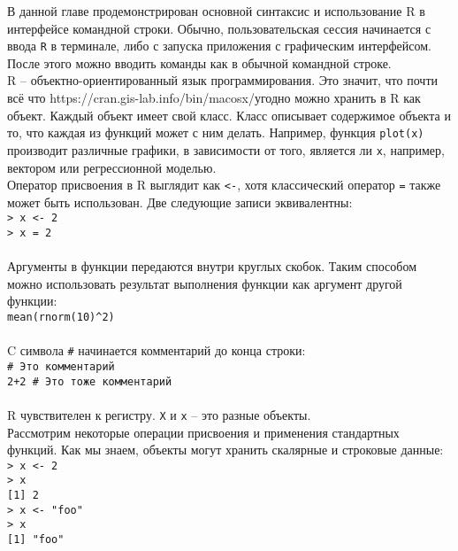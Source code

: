     В данной главе продемонстрирован основной синтаксис и использование R в интерфейсе 
    командной строки. Обычно, пользовательская сессия начинается с ввода \texttt{R} в 
    терминале, либо с запуска приложения с графическим интерфейсом. После этого можно вводить
    команды как в обычной командной строке.\\

    \indent R -- объектно-ориентированный язык программирования. Это значит, что почти всё что 
        https://cran.gis-lab.info/bin/macosx/угодно можно хранить в R как объект. Каждый объект имеет свой класс. Класс описывает
        содержимое объекта и то, что каждая из функций может с ним делать. Например, функция
        \texttt{plot(x)} производит различные графики, в зависимости от того, является ли 
        \texttt{x}, например, вектором или регрессионной моделью. \\
    
    \indent Оператор присвоения в R выглядит как \texttt{<-}, хотя классический оператор \texttt{=}
        также может быть использован. Две следующие записи эквивалентны: \\
    \indent \texttt{> x <- 2} \\
    \indent \texttt{> x = 2} \\ \\
    
    \indent Аргументы в функции передаются внутри круглых скобок. Таким способом можно использовать 
        результат выполнения функции как аргумент другой функции: \\
    \indent \texttt{mean(rnorm(10)\^{}2)} \\ \\
    
    \indent C символа \texttt{\#} начинается комментарий до конца строки: \\
    \indent \texttt{\# Это комментарий} \\
    \indent \texttt{2+2 \# Это тоже комментарий} \\ \\
    
    \indent R чувствителен к регистру. \texttt{X} и \texttt{x} -- это разные объекты. \\
    
    \indent Рассмотрим некоторые операции присвоения и применения стандартных функций. Как мы
        знаем, объекты могут хранить скалярные и строковые данные: \\
    \indent \texttt{> x <- 2} \\
    \indent \texttt{> x} \\
    \indent \texttt{[1] 2} \\
    \indent \texttt{> x <- "foo"} \\
    \indent \texttt{> x } \\
    \indent \texttt{[1] "foo"} \\ \\
    

